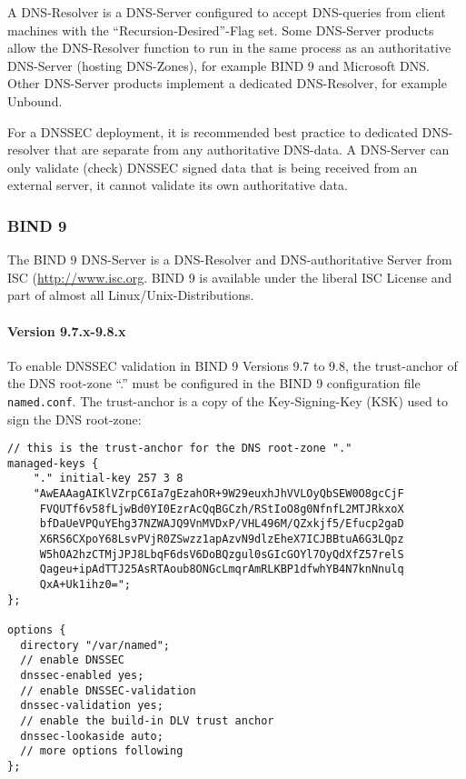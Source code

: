 A DNS-Resolver is a DNS-Server configured to accept DNS-queries from
client machines with the ``Recursion-Desired''-Flag set. Some
DNS-Server products allow the DNS-Resolver function to run in the same
process as an authoritative DNS-Server (hosting DNS-Zones), for
example BIND 9 and Microsoft DNS. Other DNS-Server products implement
a dedicated DNS-Resolver, for example Unbound.

For a DNSSEC deployment, it is recommended best practice to dedicated
DNS-resolver that are separate from any authoritative
DNS-data. A DNS-Server can only validate (check) DNSSEC signed data
that is being received from an external server, it cannot validate its
own authoritative data.

\subsubsection{BIND 9}

The BIND 9 DNS-Server is a DNS-Resolver and DNS-authoritative Server
from ISC (\url{http://www.isc.org}. BIND 9 is available under the
liberal ISC License and part of almost all Linux/Unix-Distributions.

\paragraph{Version 9.7.x-9.8.x}

To enable DNSSEC validation in BIND 9 Versions 9.7 to 9.8, the
trust-anchor of the DNS root-zone ``.'' must be configured in the BIND
9 configuration file \verb|named.conf|. The trust-anchor is a copy of
the Key-Signing-Key (KSK) used to sign the DNS root-zone:

\begin{lstlisting}
// this is the trust-anchor for the DNS root-zone "."
managed-keys {
    "." initial-key 257 3 8
    "AwEAAagAIKlVZrpC6Ia7gEzahOR+9W29euxhJhVVLOyQbSEW0O8gcCjF
     FVQUTf6v58fLjwBd0YI0EzrAcQqBGCzh/RStIoO8g0NfnfL2MTJRkxoX
     bfDaUeVPQuYEhg37NZWAJQ9VnMVDxP/VHL496M/QZxkjf5/Efucp2gaD
     X6RS6CXpoY68LsvPVjR0ZSwzz1apAzvN9dlzEheX7ICJBBtuA6G3LQpz
     W5hOA2hzCTMjJPJ8LbqF6dsV6DoBQzgul0sGIcGOYl7OyQdXfZ57relS
     Qageu+ipAdTTJ25AsRTAoub8ONGcLmqrAmRLKBP1dfwhYB4N7knNnulq
     QxA+Uk1ihz0=";
};

options {
  directory "/var/named";
  // enable DNSSEC
  dnssec-enabled yes;
  // enable DNSSEC-validation
  dnssec-validation yes;
  // enable the build-in DLV trust anchor
  dnssec-lookaside auto;
  // more options following
};
\end{lstlisting}

